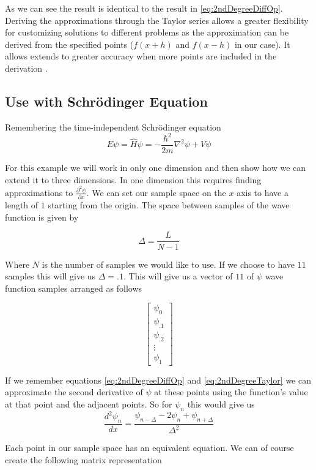 \documentclass[authoryearcitations]{UoYCSproject}
\begin{document}
As we can see the result is identical to the result in \ref{eq:2ndDegreeDiffOp}. Deriving the approximations through
the Taylor series allows a greater flexibility for customizing solutions to different problems as the approximation
can be derived from the specified points ($f(x+h)$ and $f(x-h)$ in our case). It allows extends to greater accuracy when
more points are included in the derivation \cite{cambridge}.  

\subsection{Use with Schr\"{o}dinger Equation}
\label{sec:useWithSchro}
Remembering the time-independent Schr\"{o}dinger equation
\begin{equation}
E\psi = \hat{H}\psi = -\frac{\hbar ^2}{2m}\nabla ^2\psi + V\psi \nonumber
\end{equation}

For this example we will work in only one dimension and then show how we can extend it to three dimensions. 
In one dimension this requires finding approximations to $\frac{\partial ^2 \psi}{\partial x}$. We can set our
sample space on the $x$ axis to have a length of $1$ starting from the origin. The space between samples of the 
wave function is given by

$$\Delta = \frac{L}{N - 1} $$

Where $N$ is the number of samples we would like to use. If we choose to have $11$ samples this will give us
$\Delta = .1$. This will give us a vector of $11$ of $\psi$ wave function samples arranged as follows 

$$\begin{bmatrix} 
        \psi _0  \\
        \psi _{.1}  \\
        \psi _{.2} \\
        \vdots    \\
        \psi _{1} 
   \end{bmatrix}
$$


If we remember equations \ref{eq:2ndDegreeDiffOp} and \ref{eq:2ndDegreeTaylor} we can approximate the second 
derivative of $\psi$ at these points
using the function's value at that point and the adjacent points. So for $\psi _{n}$ this would give us
$$\frac{d ^2 \psi _{n}}{dx} = \frac{\psi _{n-\Delta} - 2\psi _{n} + \psi _{n+\Delta}}{\Delta ^2} $$

Each point in our sample space has an equivalent equation. We can of course create the following matrix representation
\end{document}
